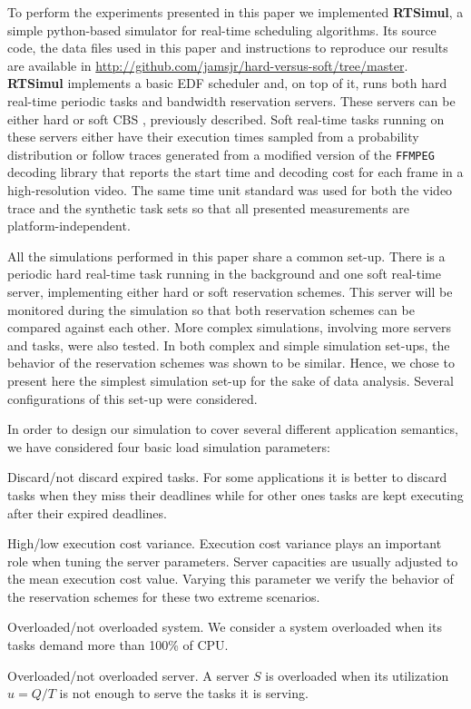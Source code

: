 \documentclass[times, 10pt,twocolumn]{article}
\newcommand{\simul}{\textbf{RTSimul}} %
\begin{document}
To perform the experiments presented in this paper we implemented
\simul{}, a simple python-based simulator for real-time scheduling
algorithms. Its source code, the data files used in this paper and
instructions to reproduce our results are available in
\url{http://github.com/jamsjr/hard-versus-soft/tree/master}. \simul{}
implements a basic EDF scheduler and, on top of it, runs both hard
real-time periodic tasks and bandwidth reservation servers. These
servers can be either hard \cite{buttazzo05:soft} or soft CBS
\cite{abeni.ea98:integrating}, previously described. Soft real-time
tasks running on these servers either have their execution times
sampled from a probability distribution or follow traces generated
from a modified version of the \texttt{FFMPEG} decoding library that
reports the start time and decoding cost for each frame in a
high-resolution video. The same time unit standard was used for both
the video trace and the synthetic task sets so that all presented
measurements are platform-independent.

All the simulations performed in this paper share a common
set-up. There is a periodic hard real-time task running in the
background and one soft real-time server, implementing either hard or
soft reservation schemes.  This server will be monitored during the
simulation so that both reservation schemes can be compared against
each other. More complex simulations, involving more servers and
tasks, were also tested. In both complex and simple simulation
set-ups, the behavior of the reservation schemes was shown to be
similar. Hence, we chose to present here the simplest simulation
set-up for the sake of data analysis.  Several configurations of this
set-up were considered.

\label{sec:configurations}

In order to design our simulation to cover several different
application semantics, we have considered four basic load simulation
parameters:
\begin{description}
\item Discard/not discard expired tasks. For some applications it is
  better to discard tasks when they miss their deadlines while for
  other ones tasks are kept executing after their expired deadlines.
\item High/low execution cost variance. Execution cost variance plays
  an important role when tuning the server parameters. Server
  capacities are usually adjusted to the mean execution cost
  value. Varying this parameter we verify the behavior of the
  reservation schemes for these two extreme scenarios.
\item Overloaded/not overloaded system. We consider a system
  overloaded when its tasks demand more than 100\% of CPU.
\item Overloaded/not overloaded server. A server $S$ is overloaded
  when its utilization $u = Q/T$ is not enough to serve the tasks it
  is serving.
\end{description}
\end{document}
